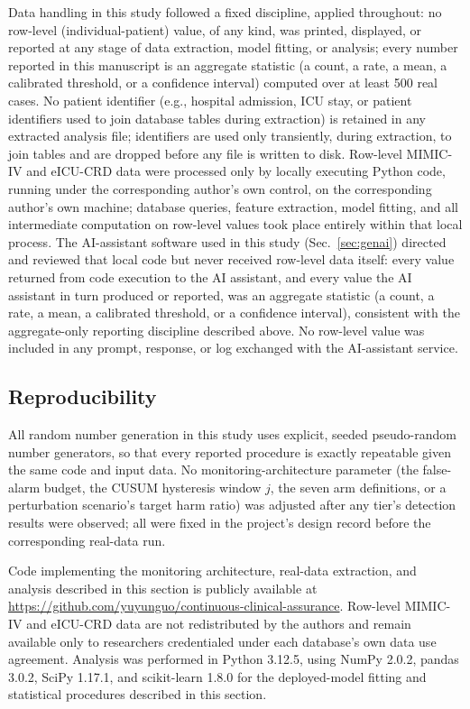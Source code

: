 \documentclass[preprintsapa,article,submit,oneauthor]{Definitions/mdpi}
\begin{document}
Data handling in this study followed a fixed discipline, applied throughout: no row-level (individual-patient) value, of any kind, was printed, displayed, or reported at any stage of data extraction, model fitting, or analysis; every number reported in this manuscript is an aggregate statistic (a count, a rate, a mean, a calibrated threshold, or a confidence interval) computed over at least 500 real cases. No patient identifier (e.g., hospital admission, ICU stay, or patient identifiers used to join database tables during extraction) is retained in any extracted analysis file; identifiers are used only transiently, during extraction, to join tables and are dropped before any file is written to disk. Row-level MIMIC-IV and eICU-CRD data were processed only by locally executing Python code, running under the corresponding author's own control, on the corresponding author's own machine; database queries, feature extraction, model fitting, and all intermediate computation on row-level values took place entirely within that local process. The AI-assistant software used in this study (Sec.~\ref{sec:genai}) directed and reviewed that local code but never received row-level data itself: every value returned from code execution to the AI assistant, and every value the AI assistant in turn produced or reported, was an aggregate statistic (a count, a rate, a mean, a calibrated threshold, or a confidence interval), consistent with the aggregate-only reporting discipline described above. No row-level value was included in any prompt, response, or log exchanged with the AI-assistant service.

\subsection{Reproducibility}\label{sec:reproducibility}

All random number generation in this study uses explicit, seeded pseudo-random number generators, so that every reported procedure is exactly repeatable given the same code and input data. No monitoring-architecture parameter (the false-alarm budget, the CUSUM hysteresis window $j$, the seven arm definitions, or a perturbation scenario's target harm ratio) was adjusted after any tier's detection results were observed; all were fixed in the project's design record before the corresponding real-data run.

Code implementing the monitoring architecture, real-data extraction, and analysis described in this section is publicly available at \url{https://github.com/yuyunguo/continuous-clinical-assurance}. Row-level MIMIC-IV and eICU-CRD data are not redistributed by the authors and remain available only to researchers credentialed under each database's own data use agreement. Analysis was performed in Python 3.12.5, using NumPy 2.0.2, pandas 3.0.2, SciPy 1.17.1, and scikit-learn 1.8.0 for the deployed-model fitting and statistical procedures described in this section.
\end{document}
